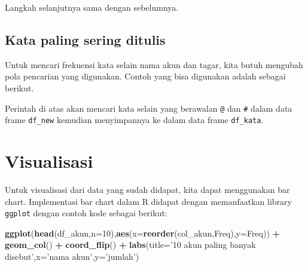 \documentclass[]{book}
\newenvironment{Shaded}{\begin{snugshade}}{\end{snugshade}}
\newcommand{\DataTypeTok}[1]{\textcolor[rgb]{0.13,0.29,0.53}{#1}}
\newcommand{\DecValTok}[1]{\textcolor[rgb]{0.00,0.00,0.81}{#1}}
\newcommand{\KeywordTok}[1]{\textcolor[rgb]{0.13,0.29,0.53}{\textbf{#1}}}
\newcommand{\NormalTok}[1]{#1}
\newcommand{\OperatorTok}[1]{\textcolor[rgb]{0.81,0.36,0.00}{\textbf{#1}}}
\newcommand{\StringTok}[1]{\textcolor[rgb]{0.31,0.60,0.02}{#1}}
\begin{document}
Langkah selanjutnya sama dengan sebelumnya.

\hypertarget{kata-paling-sering-ditulis}{%
\subsection{Kata paling sering
ditulis}\label{kata-paling-sering-ditulis}}

Untuk mencari frekuensi kata selain nama akun dan tagar, kita butuh
mengubah pola pencarian yang digunakan. Contoh yang bisa digunakan
adalah sebagai berikut.

\begin{Shaded}
\end{Shaded}

Perintah di atas akan mencari kata selain yang berawalan \texttt{@} dan
\texttt{\#} dalam data frame \texttt{df\_new} kemudian menyimpannya ke
dalam data frame \texttt{df\_kata}.

\hypertarget{visualisasi}{%
\section{Visualisasi}\label{visualisasi}}

Untuk visualisasi dari data yang sudah didapat, kita dapat menggunakan
bar chart. Implementasi bar chart dalam R didapat dengan memanfaatkan
library \texttt{ggplot} dengan contoh kode sebagai berikut:

\begin{Shaded}
\begin{Highlighting}[]
\KeywordTok{ggplot}\NormalTok{(}\KeywordTok{head}\NormalTok{(df_akun,}\DataTypeTok{n=}\DecValTok{10}\NormalTok{),}\KeywordTok{aes}\NormalTok{(}\DataTypeTok{x=}\KeywordTok{reorder}\NormalTok{(col_akun,Freq),}\DataTypeTok{y=}\NormalTok{Freq)) }\OperatorTok{+}\StringTok{ }
\StringTok{  }\KeywordTok{geom_col}\NormalTok{() }\OperatorTok{+}\StringTok{ }
\StringTok{  }\KeywordTok{coord_flip}\NormalTok{() }\OperatorTok{+}
\StringTok{  }\KeywordTok{labs}\NormalTok{(}\DataTypeTok{title=}\StringTok{'10 akun paling banyak disebut'}\NormalTok{,}\DataTypeTok{x=}\StringTok{'nama akun'}\NormalTok{,}\DataTypeTok{y=}\StringTok{'jumlah'}\NormalTok{)}
\end{Highlighting}
\end{Shaded}
\end{document}
